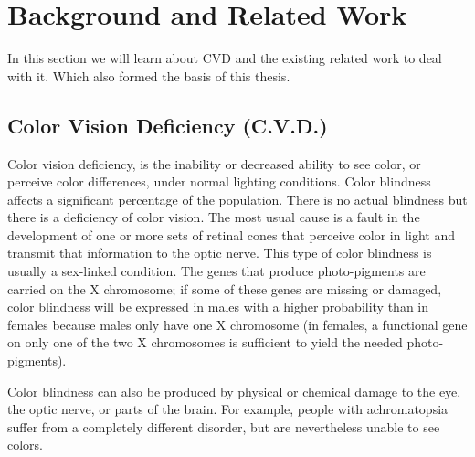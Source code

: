 \chapter{Background and Related Work}
\thispagestyle{plain}

\label{Background and Related Work}

In this section we will learn about CVD and the existing related work to deal with it. Which also formed the basis of this thesis.

\section{Color Vision Deficiency (C.V.D.)}
\label{Color Vision Deficiency}


Color vision deficiency, is the inability or decreased ability to see color, or perceive color differences, under normal lighting conditions. Color blindness affects a significant percentage of the population.  There is no actual blindness but there is a deficiency of color vision. The most usual cause is a fault in the development of one or more sets of retinal cones that perceive color in light and transmit that information to the optic nerve. This type of color blindness is usually a sex-linked condition. The genes that produce photo-pigments are carried on the X chromosome; if some of these genes are missing or damaged, color blindness will be expressed in males with a higher probability than in females because males only have one X chromosome (in females, a functional gene on only one of the two X chromosomes is sufficient to yield the needed photo-pigments).

Color blindness can also be produced by physical or chemical damage to the eye, the optic nerve, or parts of the brain. For example, people with achromatopsia suffer from a completely different disorder, but are nevertheless unable to see colors.

